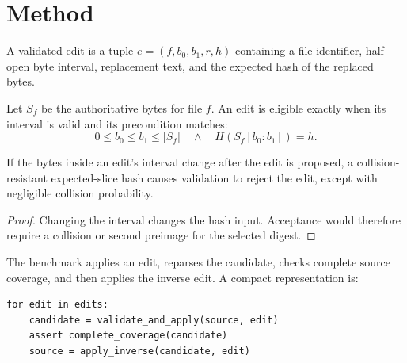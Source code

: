 \section{Method}
\label{sec:method}

\begin{definition}
A validated edit is a tuple
$e=(f,b_0,b_1,r,h)$ containing a file identifier, half-open byte interval,
replacement text, and the expected hash of the replaced bytes.
\end{definition}

Let $S_f$ be the authoritative bytes for file $f$. An edit is eligible exactly
when its interval is valid and its precondition matches:
\begin{equation}
  \label{eq:eligibility}
  0 \le b_0 \le b_1 \le \lvert S_f \rvert
  \quad\land\quad
  H(S_f[b_0:b_1]) = h.
\end{equation}

\begin{theorem}
If the bytes inside an edit's interval change after the edit is proposed, a
collision-resistant expected-slice hash causes validation to reject the edit,
except with negligible collision probability.
\end{theorem}

\begin{proof}
Changing the interval changes the hash input. Acceptance would therefore
require a collision or second preimage for the selected digest.
\end{proof}

The benchmark applies an edit, reparses the candidate, checks complete source
coverage, and then applies the inverse edit. A compact representation is:

\begin{lstlisting}[language={},caption={Illustrative edit loop.},label={lst:loop}]
for edit in edits:
    candidate = validate_and_apply(source, edit)
    assert complete_coverage(candidate)
    source = apply_inverse(candidate, edit)
\end{lstlisting}
